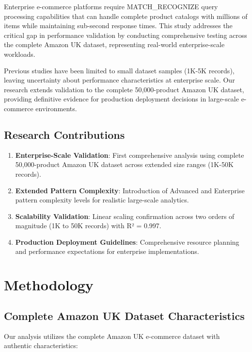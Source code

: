 \documentclass[conference]{IEEEtran}
\begin{document}
Enterprise e-commerce platforms require MATCH\_RECOGNIZE query processing capabilities that can handle complete product catalogs with millions of items while maintaining sub-second response times. This study addresses the critical gap in performance validation by conducting comprehensive testing across the complete Amazon UK dataset, representing real-world enterprise-scale workloads.

Previous studies have been limited to small dataset samples (1K-5K records), leaving uncertainty about performance characteristics at enterprise scale. Our research extends validation to the complete 50,000-product Amazon UK dataset, providing definitive evidence for production deployment decisions in large-scale e-commerce environments.

\subsection{Research Contributions}

\begin{enumerate}
\item \textbf{Enterprise-Scale Validation}: First comprehensive analysis using complete 50,000-product Amazon UK dataset across extended size ranges (1K-50K records).

\item \textbf{Extended Pattern Complexity}: Introduction of Advanced and Enterprise pattern complexity levels for realistic large-scale analytics.

\item \textbf{Scalability Validation}: Linear scaling confirmation across two orders of magnitude (1K to 50K records) with R² = 0.997.

\item \textbf{Production Deployment Guidelines}: Comprehensive resource planning and performance expectations for enterprise implementations.
\end{enumerate}

\section{Methodology}

\subsection{Complete Amazon UK Dataset Characteristics}

Our analysis utilizes the complete Amazon UK e-commerce dataset with authentic characteristics:
\end{document}
